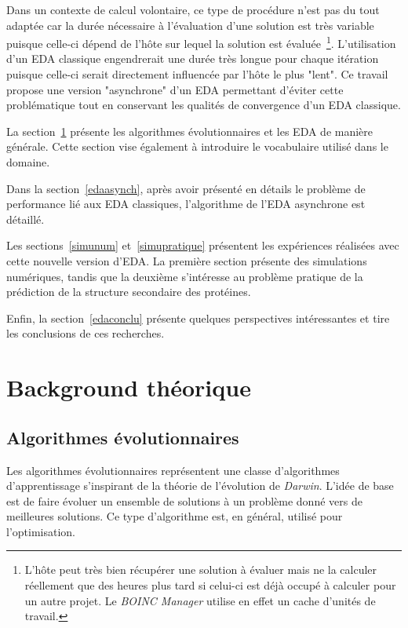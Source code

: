 \documentclass[a4paper, 12pt]{report}
\begin{document}
Dans un contexte de calcul volontaire, ce type de procédure n'est pas du tout adaptée car la durée nécessaire à l'évaluation d'une solution est très variable puisque celle-ci dépend de l'hôte sur lequel la solution est évaluée~\footnote{L'hôte peut très bien récupérer une solution à évaluer mais ne la calculer réellement que des heures plus tard si celui-ci est déjà occupé à calculer pour un autre projet. Le \textit{BOINC Manager} utilise en effet un cache d'unités de travail.}. L'utilisation d'un EDA classique engendrerait une durée très longue pour chaque itération puisque celle-ci serait directement influencée par l'hôte le plus "lent". Ce travail propose une version "asynchrone" d'un EDA permettant d'éviter cette problématique tout en conservant les qualités de convergence d'un EDA classique.

La section~\ref{background} présente les algorithmes évolutionnaires et les EDA de manière générale. Cette section vise également à introduire le vocabulaire utilisé dans le domaine.

Dans la section~\ref{edaasynch}, après avoir présenté en détails le problème de performance lié aux EDA classiques, l'algorithme de l'EDA asynchrone est détaillé.

Les sections~\ref{simunum} et~\ref{simupratique} présentent les expériences réalisées avec cette nouvelle version d'EDA. La première section présente des simulations numériques, tandis que la deuxième s'intéresse au problème pratique de la prédiction de la structure secondaire des protéines.

Enfin, la section~\ref{edaconclu} présente quelques perspectives intéressantes et tire les conclusions de ces recherches.

\section{Background théorique}
\label{background}
\subsection{Algorithmes évolutionnaires}
\label{evointro}
Les algorithmes évolutionnaires représentent une classe d'algorithmes d'apprentissage s'inspirant de la théorie de l'évolution de \textit{Darwin}. L'idée de base est de faire évoluer un ensemble de solutions à un problème donné vers de meilleures solutions. Ce type d'algorithme est, en général, utilisé pour l'optimisation.
\end{document}

